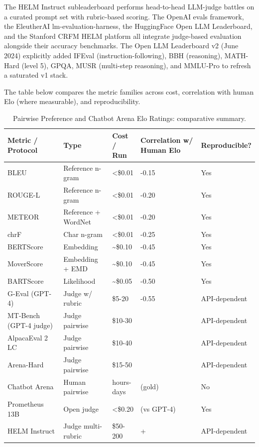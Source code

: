 \documentclass{article}
\begin{document}
The HELM Instruct subleaderboard performs head-to-head LLM-judge battles on a curated prompt set with rubric-based scoring. The OpenAI evals framework, the EleutherAI lm-evaluation-harness, the HuggingFace Open LLM Leaderboard, and the Stanford CRFM HELM platform all integrate judge-based evaluation alongside their accuracy benchmarks. The Open LLM Leaderboard v2 (June 2024) explicitly added IFEval (instruction-following), BBH (reasoning), MATH-Hard (level 5), GPQA, MUSR (multi-step reasoning), and MMLU-Pro to refresh a saturated v1 stack.

The table below compares the metric families across cost, correlation with human Elo (where measurable), and reproducibility.

\begin{table}[t]
\centering
\caption{Pairwise Preference and Chatbot Arena Elo Ratings: comparative summary.}
\label{tab:pairwise-preference-and-chatbot-arena-elo-ratings}
\begin{tabular}{>{\raggedright\arraybackslash}p{0.2500\linewidth}
  >{\raggedright\arraybackslash}p{0.2159\linewidth}
  >{\raggedright\arraybackslash}p{0.1136\linewidth}
  >{\raggedright\arraybackslash}p{0.2727\linewidth}
  >{\raggedright\arraybackslash}p{0.1477\linewidth}}
\toprule
Metric / Protocol & Type & Cost / Run & Correlation w/ Human Elo & Reproducible? \\
\midrule
BLEU & Reference n-gram & \textless\$0.01 & 0.05-0.15 & Yes \\
ROUGE-L & Reference n-gram & \textless\$0.01 & 0.10-0.20 & Yes \\
METEOR & Reference + WordNet & \textless\$0.01 & 0.10-0.20 & Yes \\
chrF & Char n-gram & \textless\$0.01 & 0.10-0.25 & Yes \\
BERTScore & Embedding & \textasciitilde\$0.10 & 0.30-0.45 & Yes \\
MoverScore & Embedding + EMD & \textasciitilde\$0.10 & 0.30-0.45 & Yes \\
BARTScore & Likelihood & \textasciitilde\$0.05 & 0.40-0.50 & Yes \\
G-Eval (GPT-4) & Judge w/ rubric & \$5-20 & 0.50-0.55 & API-dependent \\
MT-Bench (GPT-4 judge) & Judge pairwise & \$10-30 & 0.95 & API-dependent \\
AlpacaEval 2 LC & Judge pairwise & \$10-40 & 0.97 & API-dependent \\
Arena-Hard & Judge pairwise & \$15-50 & 0.98 & API-dependent \\
Chatbot Arena & Human pairwise & hours-days & 1.0 (gold) & No \\
Prometheus 13B & Open judge & \textless\$0.20 & 0.85 (vs GPT-4) & Yes \\
HELM Instruct & Judge multi-rubric & \$50-200 & 0.90+ & API-dependent \\
\end{tabular}
\end{table}
\end{document}
